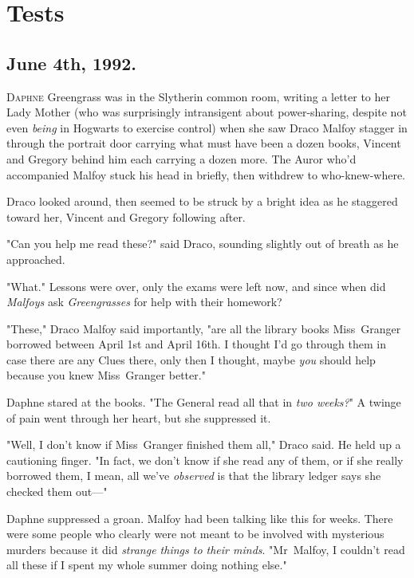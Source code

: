 \chapter{Tests}

\section{June 4th, 1992.}

\lettrine{D}{aphne} Greengrass was in the Slytherin common room, writing a letter to her
Lady Mother (who was surprisingly intransigent about power-sharing, despite not
even \emph{being} in Hogwarts to exercise control) when she saw Draco Malfoy
stagger in through the portrait door carrying what must have been a dozen
books, Vincent and Gregory behind him each carrying a dozen more. The Auror
who'd accompanied Malfoy stuck his head in briefly, then withdrew to
who-knew-where.

Draco looked around, then seemed to be struck by a bright idea as he staggered
toward her, Vincent and Gregory following after.

"Can you help me read these?" said Draco, sounding slightly out of breath as he
approached.

"What." Lessons were over, only the exams were left now, and since when
did \emph{Malfoys} ask \emph{Greengrasses} for help with their homework?

"These," Draco Malfoy said importantly, "are all the library books Miss~Granger
borrowed between April 1st and April 16th. I thought I'd go through them in
case there are any Clues there, only then I thought, maybe \emph{you} should
help because you knew Miss~Granger better."

Daphne stared at the books. "The General read all that in \emph{two weeks?}" A
twinge of pain went through her heart, but she suppressed it.

"Well, I don't know if Miss~Granger finished them all," Draco said. He held up
a cautioning finger. "In fact, we don't know if she read any of them, or if she
really borrowed them, I mean, all we've \emph{observed} is that the library
ledger says she checked them out—"

Daphne suppressed a groan. Malfoy had been talking like this for weeks. There
were some people who clearly were not meant to be involved with mysterious
murders because it did \emph{strange things to their minds}. "Mr~Malfoy, I
couldn't read all these if I spent my whole summer doing nothing else."

